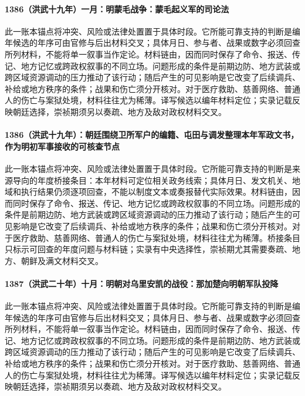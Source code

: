 \paragraph{1386（洪武十九年）一月：明蒙毛战争：蒙毛起义军的司论法} 此一账本锚点将冲突、风险或法律处置置于具体时段。它所能可靠支持的判断是编年候选的年序可由官修与后出材料交叉；具体月日、参与者、战果或数字必须回查所列材料，不能将单一叙事当作定论。材料链由，因而同时保存了命令、报送、传记、地方记忆或跨政权叙事的不同立场。问题形成的条件是前期边防、地方武装或跨区域资源调动的压力推动了该行动；随后产生的可见影响是它改变了后续调兵、补给或地方秩序的条件；战果和伤亡须分开核对。对于医疗救助、慈善网络、普通人的伤亡与案狱处境，材料往往尤为稀薄。译写候选以编年材料定位；实录记载反映朝廷选择，崇祯期须另以奏疏、地方及敌对政权材料交叉。

\paragraph{1386（洪武十九年）：朝廷围绕卫所军户的编籍、屯田与调发整理本年军政文书，作为明初军事接收的可核查节点} 此一账本锚点将冲突、风险或法律处置置于具体时段。它所能可靠支持的判断是来源导向的年度桥接条目：本年材料可定位相关政务线索；具体月日、发文机关、地域和执行结果仍须逐项回查，不能以制度文本或奏报替代实际效果。材料链由，因而同时保存了命令、报送、传记、地方记忆或跨政权叙事的不同立场。问题形成的条件是前期边防、地方武装或跨区域资源调动的压力推动了该行动；随后产生的可见影响是它改变了后续调兵、补给或地方秩序的条件；战果和伤亡须分开核对。对于医疗救助、慈善网络、普通人的伤亡与案狱处境，材料往往尤为稀薄。桥接条目只标示可回查的年度问题与材料链；实录有中央选择性，崇祯期尤其需要奏疏、地方、朝鲜及满文材料交叉。

\paragraph{1387（洪武二十年）十月：明朝对乌里安凯的战役：那加楚向明朝军队投降} 此一账本锚点将冲突、风险或法律处置置于具体时段。它所能可靠支持的判断是编年候选的年序可由官修与后出材料交叉；具体月日、参与者、战果或数字必须回查所列材料，不能将单一叙事当作定论。材料链由，因而同时保存了命令、报送、传记、地方记忆或跨政权叙事的不同立场。问题形成的条件是前期边防、地方武装或跨区域资源调动的压力推动了该行动；随后产生的可见影响是它改变了后续调兵、补给或地方秩序的条件；战果和伤亡须分开核对。对于医疗救助、慈善网络、普通人的伤亡与案狱处境，材料往往尤为稀薄。译写候选以编年材料定位；实录记载反映朝廷选择，崇祯期须另以奏疏、地方及敌对政权材料交叉。

